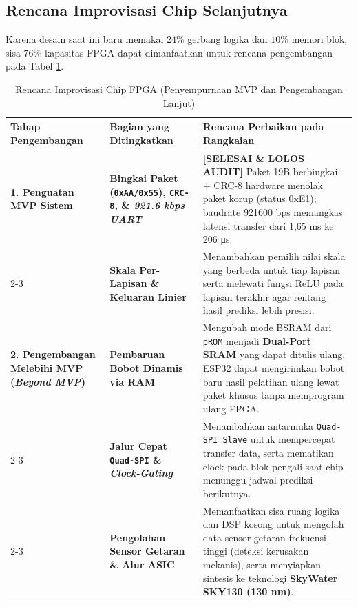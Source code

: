 \documentclass[12pt,a4paper]{article}
\begin{document}
\subsection{Rencana Improvisasi Chip Selanjutnya}
Karena desain saat ini baru memakai $24\%$ gerbang logika dan $10\%$ memori blok, sisa $76\%$ kapasitas FPGA dapat dimanfaatkan untuk rencana pengembangan pada Tabel \ref{tab:improvisasi_chip}.

\begin{table}[h!]
\centering
\small
{}
\caption{Rencana Improvisasi Chip FPGA (Penyempurnaan MVP dan Pengembangan Lanjut)}
\label{tab:improvisasi_chip}
\begin{tabularx}{\textwidth}{p{3.4cm}p{3.8cm}X}
\toprule
\textbf{Tahap Pengembangan} & \textbf{Bagian yang Ditingkatkan} & \textbf{Rencana Perbaikan pada Rangkaian} \\
\midrule
\textbf{1. Penguatan MVP Sistem} & \textbf{Bingkai Paket (\texttt{0xAA/0x55}), \texttt{CRC-8}, \& \textit{921.6 kbps UART}} & \textbf{[SELESAI \& LOLOS AUDIT]} Paket 19B berbingkai + CRC-8 hardware menolak paket korup (status 0xE1); baudrate 921600 bps memangkas latensi transfer dari 1,65 ms ke 206 μs. \\
\cmidrule{2-3}
 & \textbf{Skala Per-Lapisan \& Keluaran Linier} & Menambahkan pemilih nilai skala yang berbeda untuk tiap lapisan serta melewati fungsi ReLU pada lapisan terakhir agar rentang hasil prediksi lebih presisi. \\
\midrule
\textbf{2. Pengembangan Melebihi MVP (\textit{Beyond MVP})} & \textbf{Pembaruan Bobot Dinamis via RAM} & Mengubah mode BSRAM dari \texttt{pROM} menjadi \textbf{Dual-Port SRAM} yang dapat ditulis ulang. ESP32 dapat mengirimkan bobot baru hasil pelatihan ulang lewat paket khusus tanpa memprogram ulang FPGA. \\
\cmidrule{2-3}
 & \textbf{Jalur Cepat \texttt{Quad-SPI} \& \textit{Clock-Gating}} & Menambahkan antarmuka \texttt{Quad-SPI Slave} untuk mempercepat transfer data, serta mematikan clock pada blok pengali saat chip menunggu jadwal prediksi berikutnya. \\
\cmidrule{2-3}
 & \textbf{Pengolahan Sensor Getaran \& Alur ASIC} & Memanfaatkan sisa ruang logika dan DSP kosong untuk mengolah data sensor getaran frekuensi tinggi (deteksi kerusakan mekanis), serta menyiapkan sintesis ke teknologi \textbf{SkyWater SKY130 (130 nm)}. \\
\bottomrule
\end{tabularx}
\end{table}
\end{document}
